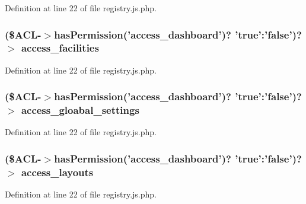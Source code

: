 \-Definition at line 22 of file registry.\-js.\-php.

\hypertarget{registry_8js_8php_a7279a20e84eea9f84718fd111d53a908}{
\subsubsection[{access\-\_\-facilities}]{ (\${\bf \-A\-C\-L}-\/$>$has\-Permission('access\-\_\-dashboard')? 'true'\-:'false')?$>$ {\bf access\-\_\-facilities}}}\label{registry_8js_8php_a7279a20e84eea9f84718fd111d53a908}


\-Definition at line 22 of file registry.\-js.\-php.

\hypertarget{registry_8js_8php_a438a1a7699013712e3a29a728b0a82eb}{
\subsubsection[{access\-\_\-gloabal\-\_\-settings}]{ (\${\bf \-A\-C\-L}-\/$>$has\-Permission('access\-\_\-dashboard')? 'true'\-:'false')?$>$ {\bf access\-\_\-gloabal\-\_\-settings}}}\label{registry_8js_8php_a438a1a7699013712e3a29a728b0a82eb}


\-Definition at line 22 of file registry.\-js.\-php.

\hypertarget{registry_8js_8php_a8c86f117a2b2228a85bac0f8808b135d}{
\subsubsection[{access\-\_\-layouts}]{ (\${\bf \-A\-C\-L}-\/$>$has\-Permission('access\-\_\-dashboard')? 'true'\-:'false')?$>$ {\bf access\-\_\-layouts}}}\label{registry_8js_8php_a8c86f117a2b2228a85bac0f8808b135d}


\-Definition at line 22 of file registry.\-js.\-php.

